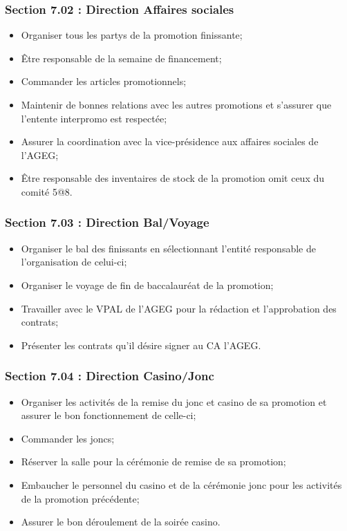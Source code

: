 \subsubsection*{Section 7.02 : Direction Affaires sociales}
\begin{itemize}
    \item Organiser tous les partys de la promotion finissante;
    \item Être responsable de la semaine de financement;
    
    \item Commander les articles promotionnels;
    \item Maintenir de bonnes relations avec les autres promotions et s'assurer que l'entente interpromo est respectée;
    \item Assurer la coordination avec la vice-présidence aux affaires sociales de l'AGEG;
    \item Être responsable des inventaires de stock de la promotion omit ceux du comité 5@8.
\end{itemize}

\subsubsection*{Section 7.03 : Direction Bal/Voyage}
\begin{itemize}
    \item Organiser le bal des finissants en sélectionnant l'entité responsable de l'organisation de celui-ci;
    \item Organiser le voyage de fin de baccalauréat de la promotion;
    \item Travailler avec le VPAL de l'AGEG pour la rédaction et l'approbation des contrats;
    \item Présenter les contrats qu'il désire signer au CA l'AGEG.
\end{itemize}

\subsubsection*{Section 7.04 : Direction Casino/Jonc}
\begin{itemize}
    \item Organiser les activités de la remise du jonc et casino de sa promotion et assurer le bon fonctionnement de celle-ci;
    \item Commander les joncs;
    \item Réserver la salle pour la cérémonie de remise de sa promotion;
    \item Embaucher le personnel du casino et de la cérémonie jonc pour les activités de la promotion précédente;
    \item Assurer le bon déroulement de la soirée casino.
\end{itemize}

